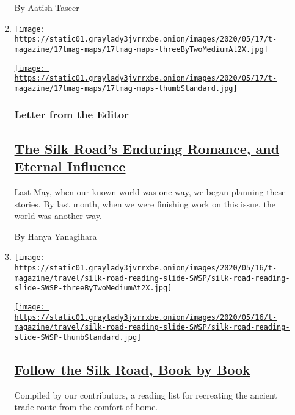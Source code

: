 \begin{enumerate}
\begin{enumerate}
    By Aatish Taseer
  \item
    \texttt{[image: https://static01.graylady3jvrrxbe.onion/images/2020/05/17/t-magazine/17tmag-maps/17tmag-maps-threeByTwoMediumAt2X.jpg]}

    \href{/2020/05/11/t-magazine/silk-road-travel-issue.html}{\texttt{[image: https://static01.graylady3jvrrxbe.onion/images/2020/05/17/t-magazine/17tmag-maps/17tmag-maps-thumbStandard.jpg]}}

    \hypertarget{letter-from-the-editor}{%
    \subsubsection{Letter from the
    Editor}\label{letter-from-the-editor}}

    \hypertarget{the-silk-roads-enduring-romance-and-eternal-influence}{%
    \subsection{\texorpdfstring{\href{/2020/05/11/t-magazine/silk-road-travel-issue.html}{The
    Silk Road's Enduring Romance, and Eternal
    Influence}}{The Silk Road's Enduring Romance, and Eternal Influence}}\label{the-silk-roads-enduring-romance-and-eternal-influence}}

    Last May, when our known world was one way, we began planning these
    stories. By last month, when we were finishing work on this issue,
    the world was another way.

    By Hanya Yanagihara
  \item
    \texttt{[image: https://static01.graylady3jvrrxbe.onion/images/2020/05/16/t-magazine/travel/silk-road-reading-slide-SWSP/silk-road-reading-slide-SWSP-threeByTwoMediumAt2X.jpg]}

    \href{/2020/05/11/t-magazine/silk-road-reading-list-books-movies.html}{\texttt{[image: https://static01.graylady3jvrrxbe.onion/images/2020/05/16/t-magazine/travel/silk-road-reading-slide-SWSP/silk-road-reading-slide-SWSP-thumbStandard.jpg]}}

    \hypertarget{follow-the-silk-road-book-by-book}{%
    \subsection{\texorpdfstring{\href{/2020/05/11/t-magazine/silk-road-reading-list-books-movies.html}{Follow
    the Silk Road, Book by
    Book}}{Follow the Silk Road, Book by Book}}\label{follow-the-silk-road-book-by-book}}

    Compiled by our contributors, a reading list for recreating the
    ancient trade route from the comfort of home.
  \end{enumerate}
\end{enumerate}

